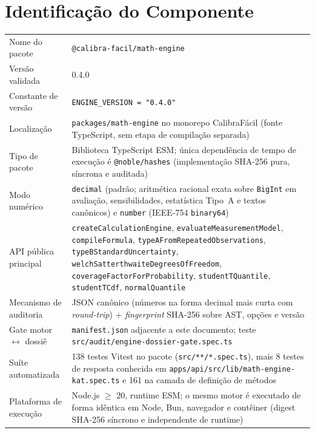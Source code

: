 \documentclass[11pt,a4paper]{article}
\newcommand{\docVersion}{0.4.0}
\begin{document}
\section{Identificação do Componente}

\begin{tabularx}{\textwidth}{l X}
  \toprule
  Nome do pacote          & \texttt{@calibra-facil/math-engine} \\
  Versão validada         & \docVersion \\
  Constante de versão     & \texttt{ENGINE\_VERSION = "\docVersion"} \\
  Localização             & \texttt{packages/math-engine} no monorepo CalibraFácil (fonte TypeScript, sem etapa de compilação separada) \\
  Tipo de pacote          & Biblioteca TypeScript ESM; única dependência de tempo de execução é \texttt{@noble/hashes} (implementação SHA-256 pura, síncrona e auditada) \\
  Modo numérico           & \texttt{decimal} (padrão; aritmética racional exata sobre \texttt{BigInt} em avaliação, sensibilidades, estatística Tipo~A e textos canônicos) e \texttt{number} (IEEE-754 \texttt{binary64}) \\
  API pública principal   & \texttt{createCalculationEngine}, \texttt{evaluateMeasurementModel}, \texttt{compileFormula}, \texttt{typeAFromRepeatedObservations}, \texttt{typeBStandardUncertainty}, \texttt{welchSatterthwaiteDegreesOfFreedom}, \texttt{coverageFactorForProbability}, \texttt{studentTQuantile}, \texttt{studentTCdf}, \texttt{normalQuantile} \\
  Mecanismo de auditoria  & JSON canônico (números na forma decimal mais curta com \emph{round-trip}) + \emph{fingerprint} SHA-256 sobre AST, opções e versão \\
  Gate motor \(\leftrightarrow\) dossiê & \texttt{manifest.json} adjacente a este documento; teste \texttt{src/audit/engine-dossier-gate.spec.ts} \\
  Suíte automatizada      & 138 testes Vitest no pacote (\texttt{src/**/*.spec.ts}), mais 8 testes de resposta conhecida em \texttt{apps/api/src/lib/math-engine-kat.spec.ts} e 161 na camada de definição de métodos \\
  Plataforma de execução  & Node.js \(\geq\) 20, runtime ESM; o mesmo motor é executado de forma idêntica em Node, Bun, navegador e contêiner (digest SHA-256 síncrono e independente de runtime) \\
  \bottomrule
\end{tabularx}
\end{document}
